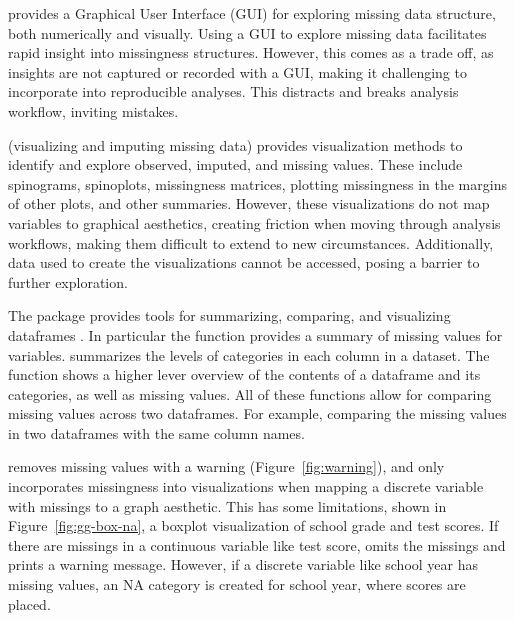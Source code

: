 \documentclass[article]{jss}
\begin{document}
 \citep{pkg:MissingDataGUI}
provides a Graphical User Interface (GUI) for exploring
missing data structure, both numerically and visually.  Using a GUI to
explore missing data facilitates rapid insight into missingness structures.
However, this comes as a trade off, as insights are not captured or recorded
with a GUI, making it challenging to incorporate into reproducible analyses.
This distracts and breaks analysis workflow, inviting mistakes.

 (visualizing and imputing missing data) provides visualization
methods to identify and explore observed, imputed, and missing values.
These include spinograms, spinoplots, missingness matrices, plotting
missingness in the margins of other plots, and other summaries.  However,
these visualizations do not map variables to graphical aesthetics, creating
friction when moving through analysis workflows, making them difficult to
extend to new circumstances.  Additionally, data used to create the
visualizations cannot be accessed, posing a barrier to further exploration.

The  package provides tools for summarizing, comparing, and
visualizing dataframes \citep{inspectdf}.  In particular the
 function provides a summary of missing values for
variables.   summarizes the levels of categories in
each column in a dataset.  The  function shows a higher
lever overview of the contents of a dataframe and its categories, as well as
missing values.  All of these functions allow for comparing missing values
across two dataframes.  For example, comparing the missing values in two
dataframes with the same column names.

 removes missing values with a warning
(Figure~\ref{fig:warning}), and only incorporates missingness into
visualizations when mapping a discrete variable with missings to a graph
aesthetic.  This has some limitations, shown in Figure~\ref{fig:gg-box-na},
a boxplot visualization of school grade and test scores.  If there are
missings in a continuous variable like test score,  omits the
missings and prints a warning message.  However, if a discrete variable like
school year has missing values, an NA category is created for school year,
where scores are placed.
\end{document}
